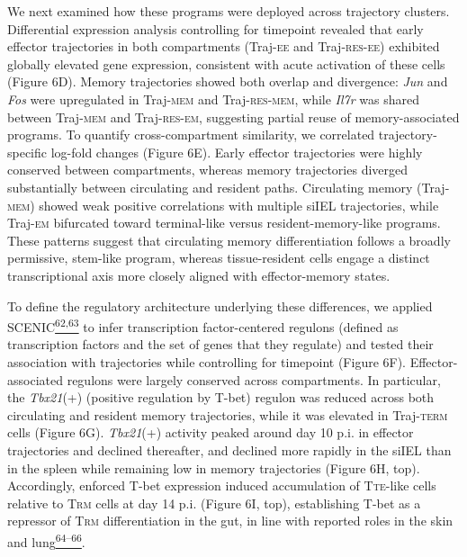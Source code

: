 We next examined how these programs were deployed across trajectory
clusters. Differential expression analysis controlling for timepoint
revealed that early effector trajectories in both compartments
(Traj-\textsc{ee} and Traj-\textsc{res-ee}) exhibited globally elevated
gene expression, consistent with acute activation of these cells (Figure
6D). Memory trajectories showed both overlap and divergence: \emph{Jun}
and \emph{Fos} were upregulated in Traj-\textsc{mem} and
Traj-\textsc{res-mem}, while \emph{Il7r} was shared between
Traj-\textsc{mem} and Traj-\textsc{res-em}, suggesting partial reuse of
memory-associated programs. To quantify cross-compartment similarity, we
correlated trajectory-specific log-fold changes (Figure 6E). Early
effector trajectories were highly conserved between compartments,
whereas memory trajectories diverged substantially between circulating
and resident paths. Circulating memory (Traj-\textsc{mem}) showed weak
positive correlations with multiple siIEL trajectories, while
Traj-\textsc{em} bifurcated toward terminal-like versus
resident-memory-like programs. These patterns suggest that circulating
memory differentiation follows a broadly permissive, stem-like program,
whereas tissue-resident cells engage a distinct transcriptional axis
more closely aligned with effector-memory states.

To define the regulatory architecture underlying these differences, we
applied
SCENIC\href{https://sciwheel.com/work/citation?ids=4362786,9127757\&pre=\&pre=\&suf=\&suf=\&sa=0,0\&dbf=0\&dbf=0}{\textsuperscript{62,63}}
to infer transcription factor-centered regulons (defined as
transcription factors and the set of genes that they regulate) and
tested their association with trajectories while controlling for
timepoint (Figure 6F). Effector-associated regulons were largely
conserved across compartments. In particular, the \emph{Tbx21}(+)
(positive regulation by T-bet) regulon was reduced across both
circulating and resident memory trajectories, while it was elevated in
Traj-\textsc{term} cells (Figure 6G). \emph{Tbx21}(+) activity peaked
around day 10 p.i. in effector trajectories and declined thereafter, and
declined more rapidly in the siIEL than in the spleen while remaining
low in memory trajectories (Figure 6H, top).
Accordingly, enforced T-bet expression induced accumulation of
T\textsc{te-}like cells relative to T\textsc{rm} cells at day 14 p.i.
(Figure 6I, top), establishing T-bet as a repressor of T\textsc{rm}
differentiation in the gut, in line with reported roles in the skin and
lung\href{https://sciwheel.com/work/citation?ids=1306176,3583222,1168744\&pre=\&pre=\&pre=\&suf=\&suf=\&suf=\&sa=0,0,0\&dbf=0\&dbf=0\&dbf=0}{\textsuperscript{64--66}}.

